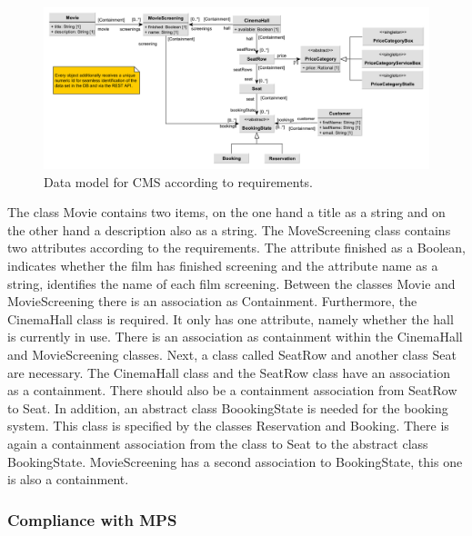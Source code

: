\begin{figure}[H]
    \centering
    \includegraphics[width=\textwidth]{images/data-model-final-with-price}
    \caption{Data model for CMS according to requirements.}
    \label{fig:data-model}
\end{figure}

The class Movie contains two items, on the one hand a title as a string and on the other hand a description also as a string. The MoveScreening class contains two attributes according to the requirements. The attribute finished as a Boolean, indicates whether the film has finished screening and the attribute name as a string, identifies the name of each film screening. Between the classes Movie and MovieScreening there is an association as Containment. Furthermore, the CinemaHall class is required. It only has one attribute, namely whether the hall is currently in use. There is an association as containment within the CinemaHall and MovieScreening classes. Next, a class called SeatRow and another class Seat are necessary. The CinemaHall class and the SeatRow class have an association as a containment. There should also be a containment association from SeatRow to Seat. In addition, an abstract class BoookingState is needed for the booking system. This class is specified by the classes Reservation and Booking. There is again a containment association from the class to Seat to the abstract class BookingState. MovieScreening has a second association to BookingState, this one is also a containment. 

\subsubsection{Compliance with MPS}



